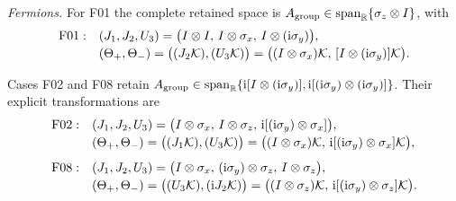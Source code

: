 \medskip\noindent\textit{Fermions.}\quad
For F01 the complete retained space is
\(A_{\rm group}\in\operatorname{span}_{\mathbb R}
\{\sigma_z\otimes I\}\), with
\begin{align*}
\mathrm{F01}:\quad
 &(J_1,J_2,U_3)=
 \bigl(I\otimes I,\,I\otimes\sigma_x,\,
 I\otimes(\mathrm{i}\sigma_y)\bigr),\\[-2pt]
 &(\Theta_+,\Theta_-)=
 \bigl((J_2\mathcal{K}),(U_3\mathcal{K})\bigr)
 =\bigl((I\otimes\sigma_x)\mathcal{K},\,
 [I\otimes(\mathrm{i}\sigma_y)]\mathcal{K}\bigr).
\end{align*}

Cases F02 and F08 retain
\(A_{\rm group}\in\operatorname{span}_{\mathbb R}
\{\mathrm{i}[I\otimes(\mathrm{i}\sigma_y)],
\mathrm{i}[(\mathrm{i}\sigma_y)\otimes(\mathrm{i}\sigma_y)]\}\).
Their explicit transformations are
\begin{align*}
\mathrm{F02}:\quad
 &(J_1,J_2,U_3)=
 \bigl(I\otimes\sigma_x,\,I\otimes\sigma_z,\,
 \mathrm{i}[(\mathrm{i}\sigma_y)\otimes\sigma_x]\bigr),\\[-2pt]
 &(\Theta_+,\Theta_-)=
 \bigl((J_1\mathcal{K}),(U_3\mathcal{K})\bigr)
 =\bigl((I\otimes\sigma_x)\mathcal{K},\,
 \mathrm{i}[(\mathrm{i}\sigma_y)\otimes\sigma_x]\mathcal{K}\bigr),\\[4pt]
\mathrm{F08}:\quad
 &(J_1,J_2,U_3)=
 \bigl(I\otimes\sigma_x,\,
 (\mathrm{i}\sigma_y)\otimes\sigma_z,\,I\otimes\sigma_z\bigr),\\[-2pt]
 &(\Theta_+,\Theta_-)=
 \bigl((U_3\mathcal{K}),(\mathrm{i} J_2\mathcal{K})\bigr)
 =\bigl((I\otimes\sigma_z)\mathcal{K},\,
 \mathrm{i}[(\mathrm{i}\sigma_y)\otimes\sigma_z]\mathcal{K}\bigr).
\end{align*}

